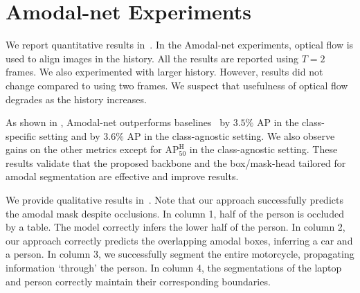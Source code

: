 \section{Amodal-net Experiments}

We report quantitative results in~. 
In the Amodal-net experiments, optical flow is used to align images in the history. All the results are reported using $T = 2$ frames. We also experimented with larger history. However, results did not change compared to using two frames. We suspect that usefulness of optical flow degrades as the history increases. %

As shown in , Amodal-net outperforms baselines~\cite{hu2019sail} by $3.5\%$ AP in the class-specific setting and by $3.6\%$ %
AP in the class-agnostic setting. We also observe gains on the other metrics except for $\text{AP}_{\text{50}}^{\text{H}}$ in the class-agnostic setting. These results validate that the proposed backbone and the box/mask-head tailored for amodal segmentation are effective and improve results.


We provide qualitative results in~. Note that our approach successfully predicts the amodal mask despite occlusions. 
In column 1, half of the person is occluded by a table. The model correctly infers the lower half of the person. In column 2, our approach correctly predicts the overlapping amodal boxes, inferring a car and a person.
In column 3, we successfully segment  the entire motorcycle, propagating information `through' the person.
In column 4, the segmentations of the laptop and person correctly maintain their corresponding boundaries.   



